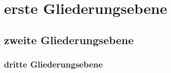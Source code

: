
\section{erste Gliederungsebene}		   	%
\subsection{zweite Gliederungsebene}	   	%
\subsubsection{dritte Gliederungsebene}		%
